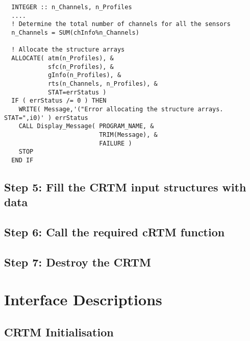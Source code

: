 \begin{ttfamily}
  \begin{verbatim}
  INTEGER :: n_Channels, n_Profiles
  ....
  ! Determine the total number of channels for all the sensors
  n_Channels = SUM(chInfo%n_Channels)
  
  ! Allocate the structure arrays
  ALLOCATE( atm(n_Profiles), &
            sfc(n_Profiles), &
            gInfo(n_Profiles), &
            rts(n_Channels, n_Profiles), &
            STAT=errStatus )
  IF ( errStatus /= 0 ) THEN 
    WRITE( Message,'("Error allocating the structure arrays. STAT=",i0)' ) errStatus
    CALL Display_Message( PROGRAM_NAME, &
                          TRIM(Message), & 
                          FAILURE )
    STOP
  END IF\end{verbatim}
\end{ttfamily}



\subsection{Step 5: Fill the CRTM input structures with data}

\subsection{Step 6: Call the required cRTM function}

\subsection{Step 7: Destroy the CRTM}


\section{Interface Descriptions}

\subsection{CRTM Initialisation}

